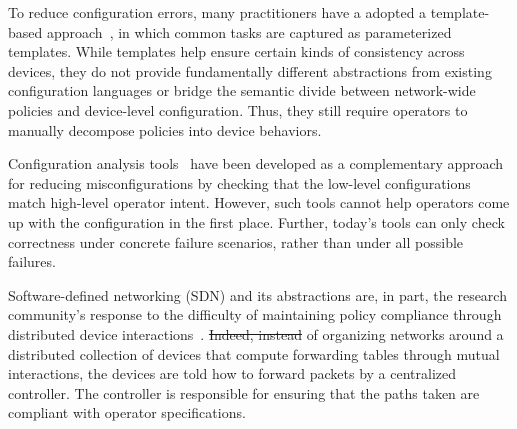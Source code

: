 \documentclass{sig-alternate-10pt}
\providecommand{\DIFadd}[1]{{\protect\color{blue}\uwave{#1}}} %
\providecommand{\DIFdel}[1]{{\protect\color{red}\sout{#1}}}                      %
\providecommand{\DIFaddbegin}{} %
\providecommand{\DIFaddend}{} %
\providecommand{\DIFdelbegin}{} %
\providecommand{\DIFdelend}{} %
\begin{document}
To reduce configuration errors, many practitioners have a adopted a template-based
approach~\cite{hatch,thwack}, in which common tasks are captured as parameterized templates.
%
%
While templates help ensure certain kinds of consistency across devices,
they do not provide fundamentally different abstractions from existing configuration languages
or bridge the semantic divide between network-wide policies and device-level configuration.
Thus, they still require operators to
manually decompose policies into device behaviors.

Configuration analysis tools~\cite{batfish,feamster+:rcc} have been developed as a complementary approach for reducing misconfigurations by checking that the low-level configurations match high-level operator intent. However, such tools cannot help operators come up with the configuration in the first place. Further, today's tools can only check correctness under concrete failure scenarios, rather than under all possible failures.

Software-defined networking (SDN) and its abstractions
are, in part, the research
community's response to the difficulty of maintaining policy
compliance through distributed device interactions~\cite{ethane}. 
\DIFdelbegin \DIFdel{Indeed, instead }\DIFdelend \DIFaddbegin \DIFadd{Instead }\DIFaddend of organizing networks around a distributed 
collection of devices that compute forwarding tables through
mutual interactions, the devices are told how to
forward packets by a centralized controller. The controller is responsible for ensuring that the
paths taken are compliant with operator specifications.
\end{document}
